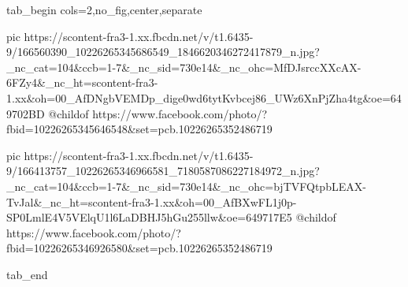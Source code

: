  
 
 
 
 


\ifcmt
  tab_begin cols=2,no_fig,center,separate

     pic https://scontent-fra3-1.xx.fbcdn.net/v/t1.6435-9/166560390_10226265345686549_1846620346272417879_n.jpg?_nc_cat=104&ccb=1-7&_nc_sid=730e14&_nc_ohc=MfDJsrccXXcAX-6FZy4&_nc_ht=scontent-fra3-1.xx&oh=00_AfDNgbVEMDp_dige0wd6tytKvbcej86_UWz6XnPjZha4tg&oe=649702BD
     @childof https://www.facebook.com/photo/?fbid=10226265345646548&set=pcb.10226265352486719

     pic https://scontent-fra3-1.xx.fbcdn.net/v/t1.6435-9/166413757_10226265346966581_7180587086227184972_n.jpg?_nc_cat=104&ccb=1-7&_nc_sid=730e14&_nc_ohc=bjTVFQtpbLEAX-TvJal&_nc_ht=scontent-fra3-1.xx&oh=00_AfBXwFL1j0p-SP0LmlE4V5VElqU1l6LaDBHJ5hGu255llw&oe=649717E5
     @childof https://www.facebook.com/photo/?fbid=10226265346926580&set=pcb.10226265352486719

  tab_end
\fi
